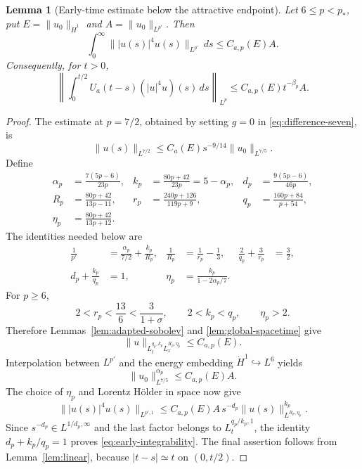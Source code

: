 \documentclass[preprint,12pt]{elsarticle}
\numberwithin{equation}{section}
\newtheorem{lemma}{Lemma}[section]
\theoremstyle{definition}
\theoremstyle{remark}
\newcommand{\norm}[2]{\lVert #1\rVert_{#2}}
\begin{document}
\begin{lemma}[Early-time estimate below the attractive endpoint]
\label{lem:early-high}
Let $6\leq p<p_*$, put
$E=\norm{u_0}{\dot H^1}$ and $A=\norm{u_0}{L^{p'}}$.
Then
\begin{equation}
 \int_0^\infty\norm{|u(s)|^4u(s)}{L^{p'}}\,ds
 \leq C_{a,p}(E)A.
 \label{eq:early-integrability}
\end{equation}
Consequently, for $t>0$,
\[
 \left\|\int_0^{t/2}U_a(t-s)(|u|^4u)(s)\,ds\right\|_{L^p}
 \leq C_{a,p}(E)t^{-\beta_p}A.
\]
\end{lemma}



\begin{proof}
The estimate at $p=7/2$, obtained by setting $g=0$ in
\eqref{eq:difference-seven}, is
\[
 \norm{u(s)}{L^{7/2}}
 \leq C_a(E)s^{-9/14}\norm{u_0}{L^{7/5}}.
\]
Define
\begin{align*}
 \alpha_p&=\frac{7(5p-6)}{23p},&
 k_p&=\frac{80p+42}{23p}=5-\alpha_p,&
 d_p&=\frac{9(5p-6)}{46p},\\
 R_p&=\frac{80p+42}{13p-11},&
 r_p&=\frac{240p+126}{119p+9},&
 q_p&=\frac{160p+84}{p+54},\\
 \eta_p&=\frac{80p+42}{13p+12}.&&&
\end{align*}
The identities needed below are
\begin{align*}
 \frac1{p'}&=\frac{\alpha_p}{7/2}+\frac{k_p}{R_p},&
 \frac1{R_p}&=\frac1{r_p}-\frac13,&
 \frac2{q_p}+\frac3{r_p}&=\frac32,\\
 d_p+\frac{k_p}{q_p}&=1,&
 \eta_p&=\frac{k_p}{1-2\alpha_p/7}.&&
\end{align*}
For $p\geq6$,
\[
 2<r_p<\frac{13}{6}<\frac3{1+\sigma},
 \qquad 2<k_p<q_p,\qquad \eta_p>2.
\]
Therefore Lemmas~\ref{lem:adapted-sobolev} and
\ref{lem:global-spacetime} give
\[
 \norm{u}{L_t^{q_p,k_p}L_x^{R_p,\eta_p}}\leq C_{a,p}(E).
\]
Interpolation between $L^{p'}$ and the energy embedding
$\dot H^1\hookrightarrow L^6$ yields
\[
 \norm{u_0}{L^{7/5}}^{\alpha_p}\leq C_{a,p}(E)A.
\]
The choice of $\eta_p$ and Lorentz H\"older in space now give
\[
 \norm{|u(s)|^4u(s)}{L^{p',1}}
 \leq C_{a,p}(E)A\,s^{-d_p}
 \norm{u(s)}{L^{R_p,\eta_p}}^{k_p}.
\]
Since $s^{-d_p}\in L^{1/d_p,\infty}$ and the last factor belongs to
$L_t^{q_p/k_p,1}$, the identity
$d_p+k_p/q_p=1$ proves \eqref{eq:early-integrability}.  The final
assertion follows from Lemma~\ref{lem:linear}, because
$|t-s|\simeq t$ on $(0,t/2)$.
\end{proof}
\end{document}
